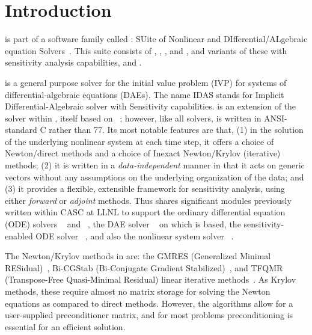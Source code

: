 \chapter{Introduction}\label{s:intro}

{\idas} is part of a software family called {\sundials}: 
SUite of Nonlinear and DIfferential/ALgebraic equation Solvers~\cite{HBGLSSW:05}. 
This suite consists of {\cvode}, {\arkode}, {\kinsol}, and {\ida}, and variants
of these with sensitivity analysis capabilities, {\cvodes} and {\idas}.

{\idas} is a general purpose solver for the initial value problem (IVP) for
systems of differential-algebraic equations (DAEs).  The name IDAS
stands for Implicit Differential-Algebraic solver with Sensitivity capabilities.
{\idas} is an extension of the {\ida} solver within {\sundials}, itself 
based on {\daspk}~\cite{BHP:94,BHP:98}; however, like all {\sundials} solvers,
{\idas} is written in ANSI-standard C rather than {\F}77.  
Its most notable features are that, 
(1) in the solution of the underlying nonlinear system at each time step, it 
offers a choice of Newton/direct methods and a choice of Inexact Newton/Krylov
(iterative) methods;
(2) it is written in a {\em data-independent} manner in that it acts
on generic vectors without any assumptions on the underlying organization
of the data; and
(3) it provides a flexible, extensible framework for sensitivity analysis,
using either {\em forward} or {\em adjoint} methods.
Thus {\idas} shares significant modules previously written within CASC
at LLNL to support the ordinary differential equation (ODE) solvers
{\cvode}~\cite{cvode_ug,CoHi:96} and {\pvode}~\cite{ByHi:98,ByHi:99},
the DAE solver {\ida}~\cite{ida_ug} on which {\idas} is based, the
sensitivity-enabled ODE solver {\cvodes}~\cite{cvodes_ug,SeHi:05}, and
also the nonlinear system solver {\kinsol}~\cite{kinsol_ug}.

The Newton/Krylov methods in {\idas} are:
the GMRES (Generalized Minimal RESidual)~\cite{SaSc:86},
Bi-CGStab (Bi-Conjugate Gradient Stabilized)~\cite{Van:92}, and
TFQMR (Transpose-Free Quasi-Minimal Residual) linear iterative 
methods~\cite{Fre:93}.  As Krylov methods, these require almost no 
matrix storage for solving the Newton equations as compared to direct
methods. However, the algorithms allow for a user-supplied preconditioner
matrix, and for most problems preconditioning is essential for an
efficient solution.

